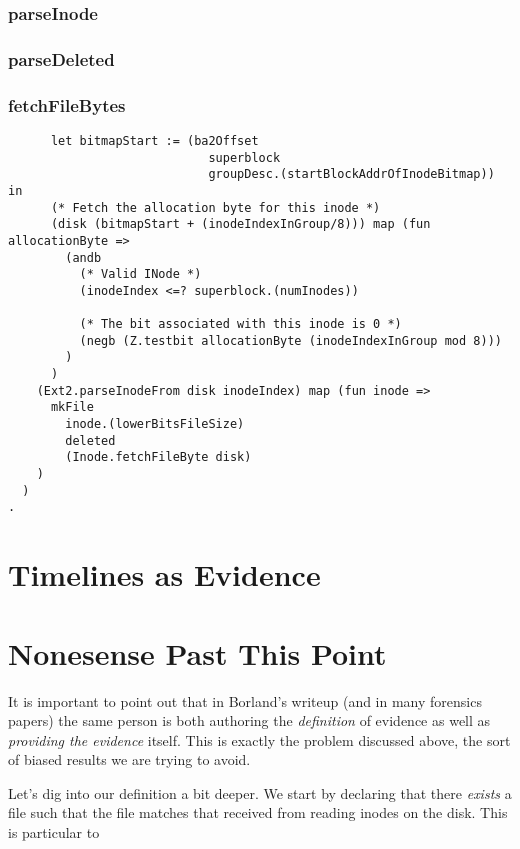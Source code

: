 \documentclass[nocopyrightspace]{sigplanconf}
\begin{document}
\subsubsection{parseInode}

\subsubsection{parseDeleted}

\subsubsection{fetchFileBytes}

\begin{lstlisting}
      let bitmapStart := (ba2Offset 
                            superblock
                            groupDesc.(startBlockAddrOfInodeBitmap)) in
      (* Fetch the allocation byte for this inode *)
      (disk (bitmapStart + (inodeIndexInGroup/8))) map (fun allocationByte =>
        (andb
          (* Valid INode *)
          (inodeIndex <=? superblock.(numInodes))

          (* The bit associated with this inode is 0 *)
          (negb (Z.testbit allocationByte (inodeIndexInGroup mod 8)))
        )
      )
    (Ext2.parseInodeFrom disk inodeIndex) map (fun inode =>
      mkFile
        inode.(lowerBitsFileSize)
        deleted
        (Inode.fetchFileByte disk)
    )
  )
.
\end{lstlisting}

\section{Timelines as Evidence}

\section{Nonesense Past This Point}

It is important to point out that in Borland's writeup (and in many forensics
papers) the same person is both authoring the {\it definition} of evidence as
well as {\it providing the evidence} itself. This is exactly the problem
discussed above, the sort of biased results we are trying to avoid.

Let's dig into our definition a bit deeper. We start by declaring that there
{\it exists} a file such that the file matches that received from reading
inodes on the disk. This is particular to 
\end{document}
